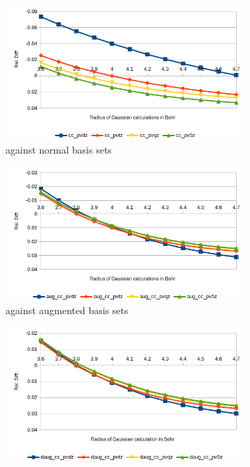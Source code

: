 \documentclass[../master_thesis.tex]{subfiles}
\begin{document}
\begin{figure}[h!]
  \centering
  \begin{subfigure}[b]{0.75\linewidth}
    \includegraphics[width=\linewidth]{img/watreldiff02.png}
        \caption{\mrchem against normal basis sets}
  \end{subfigure}
  \begin{subfigure}[b]{0.75\linewidth}
    \includegraphics[width=\linewidth]{img/wataugreldiff02.png}
        \caption{\mrchem against augmented basis sets}
  \end{subfigure}
  \begin{subfigure}[b]{0.75\linewidth}
    \includegraphics[width=\linewidth]{img/watdaugreldiff02.png}

\end{subfigure}
\end{figure}
\end{document}
